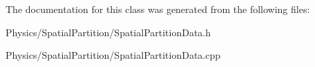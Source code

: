 The documentation for this class was generated from the following files\+:\begin{DoxyCompactItemize}
\item 
Physics/\+Spatial\+Partition/Spatial\+Partition\+Data.\+h\item 
Physics/\+Spatial\+Partition/Spatial\+Partition\+Data.\+cpp\end{DoxyCompactItemize}
